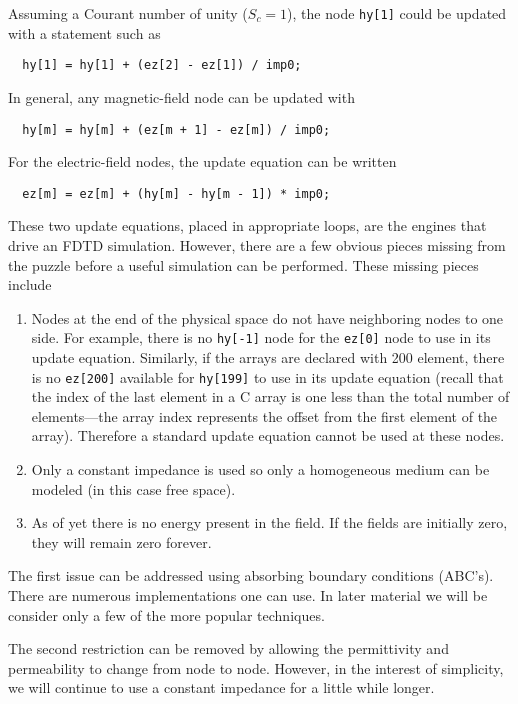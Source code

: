 Assuming a Courant number of unity ($S_c=1$), the node {\tt hy[1]}
could be updated with a statement such as
\begin{verbatim}
  hy[1] = hy[1] + (ez[2] - ez[1]) / imp0;
\end{verbatim}
In general, any magnetic-field node can be updated with
\begin{verbatim}
  hy[m] = hy[m] + (ez[m + 1] - ez[m]) / imp0;
\end{verbatim}
For the electric-field nodes, the update equation can be written
\begin{verbatim}
  ez[m] = ez[m] + (hy[m] - hy[m - 1]) * imp0;
\end{verbatim}
These two update equations, placed in appropriate loops, are the
engines that drive an FDTD simulation.  However, there are a few
obvious pieces missing from the puzzle before a useful simulation can
be performed.  These missing pieces include
\begin{enumerate}
\item Nodes at the end of the physical space do not have neighboring
  nodes to one side.  For example, there is no {\tt hy[-1]} node for
  the {\tt ez[0]} node to use in its update equation.  Similarly, if
  the arrays are declared with 200 element, there is no {\tt ez[200]}
  available for {\tt hy[199]} to use in its update equation (recall
  that the index of the last element in a C array is one less than the
  total number of elements---the array index represents the offset
  from the first element of the array).  Therefore a standard update
  equation cannot be used at these nodes.

\item Only a constant impedance is used so only a homogeneous medium
  can be modeled (in this case free space).

\item As of yet there is no energy present in the field.  If the
  fields are initially zero, they will remain zero forever.
\end{enumerate}

The first issue can be addressed using absorbing boundary conditions
(ABC's).  There are numerous implementations one can use.  In later
material we will be consider only a few of the more popular
techniques.

The second restriction can be removed by allowing the permittivity and
permeability to change from node to node.  However, in the interest of
simplicity, we will continue to use a constant impedance for a little
while longer.

